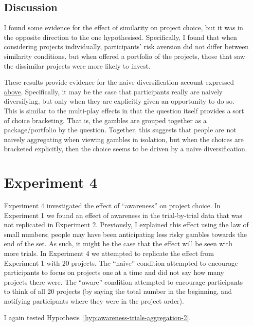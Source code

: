 \documentclass[a4paper, nobind, dvipsnames]{templates/ociamthesis}
\theoremstyle{definition}
\theoremstyle{definition}
\theoremstyle{definition}
\theoremstyle{definition}
\theoremstyle{remark}
\begin{document}
\hypertarget{discussion-7}{%
\subsection{Discussion}\label{discussion-7}}

I found some evidence for the effect of similarity on project choice, but it was
in the opposite direction to the one hypothesised. Specifically, I found that
when considering projects individually, participants' risk aversion did not
differ between similarity conditions, but when offered a portfolio of the
projects, those that saw the dissimilar projects were more likely to invest.

These results provide evidence for the naive diversification account expressed
\protect\hyperlink{similarity-discussion-aggregation-1}{above}. Specifically, it may be the case
that participants really are naively diversifying, but only when they are
explicitly given an opportunity to do so. This is similar to the multi-play
effects in that the question itself provides a sort of choice bracketing. That
is, the gambles are grouped together as a package/portfolio by the question.
Together, this suggests that people are not naively aggregating when viewing
gambles in isolation, but when the choices are bracketed explicitly, then the
choice seems to be driven by a naive diversification.

\hypertarget{aggregation-4}{%
\section{Experiment 4}\label{aggregation-4}}

Experiment 4 investigated the effect of ``awareness'' on project choice. In
Experiment 1 we found an effect of awareness in the trial-by-trial data that was
not replicated in Experiment 2. Previously, I explained this effect using the
law of small numbers; people may have been anticipating less risky gambles
towards the end of the set. As such, it might be the case that the effect will
be seen with more trials. In Experiment 4 we attempted to replicate the effect
from Experiment 1 with 20 projects. The ``naive'' condition attempted to encourage
participants to focus on projects one at a time and did not say how many
projects there were. The ``aware'' condition attempted to encourage participants
to think of all 20 projects (by saying the total number in the beginning, and
notifying participants where they were in the project order).

I again tested Hypothesis~\ref{hyp:awareness-trials-aggregation-2}.
\end{document}
